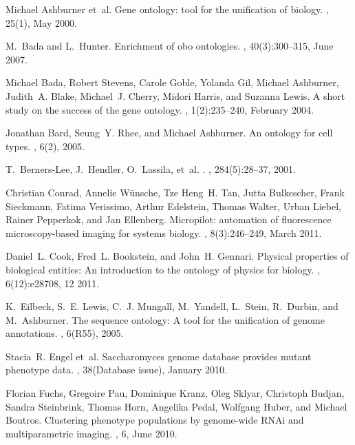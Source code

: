 \documentclass{bioinfo}
\begin{document}

\begin{thebibliography}{10}

Michael Ashburner et~al.
\newblock Gene ontology: tool for the unification of biology.
, 25(1), May 2000.

M.~Bada and L.~Hunter.
\newblock Enrichment of obo ontologies.
, 40(3):300--315, June 2007.

Michael Bada, Robert Stevens, Carole Goble, Yolanda Gil, Michael Ashburner,
  Judith~A. Blake, Michael~J. Cherry, Midori Harris, and Suzanna Lewis.
\newblock A short study on the success of the gene ontology.
, 1(2):235--240, February 2004.

Jonathan Bard, Seung~Y. Rhee, and Michael Ashburner.
\newblock An ontology for cell types.
, 6(2), 2005.

T.~Berners-Lee, J.~Hendler, O.~Lassila, et~al.
.
, 284(5):28--37, 2001.

Christian Conrad, Annelie W\"{u}nsche, Tze Heng~H. Tan, Jutta Bulkescher, Frank
  Sieckmann, Fatima Verissimo, Arthur Edelstein, Thomas Walter, Urban Liebel,
  Rainer Pepperkok, and Jan Ellenberg.
\newblock Micropilot: automation of fluorescence microscopy-based imaging for
  systems biology.
, 8(3):246--249, March 2011.

Daniel~L. Cook, Fred~L. Bookstein, and John~H. Gennari.
\newblock Physical properties of biological entities: An introduction to the
  ontology of physics for biology.
, 6(12):e28708, 12 2011.

K.~Eilbeck, S.~E. Lewis, C.~J. Mungall, M.~Yandell, L.~Stein, R.~Durbin, and
  M.~Ashburner.
\newblock The sequence ontology: A tool for the unification of genome
  annotations.
, 6(R55), 2005.

Stacia~R. Engel et~al.
\newblock Saccharomyces genome database provides mutant phenotype data.
, 38(Database issue), January 2010.

Florian Fuchs, Gregoire Pau, Dominique Kranz, Oleg Sklyar, Christoph Budjan,
  Sandra Steinbrink, Thomas Horn, Angelika Pedal, Wolfgang Huber, and Michael
  Boutros.
\newblock Clustering phenotype populations by genome-wide {RNAi} and
  multiparametric imaging.
, 6, June 2010.


\end{thebibliography}
\end{document}
